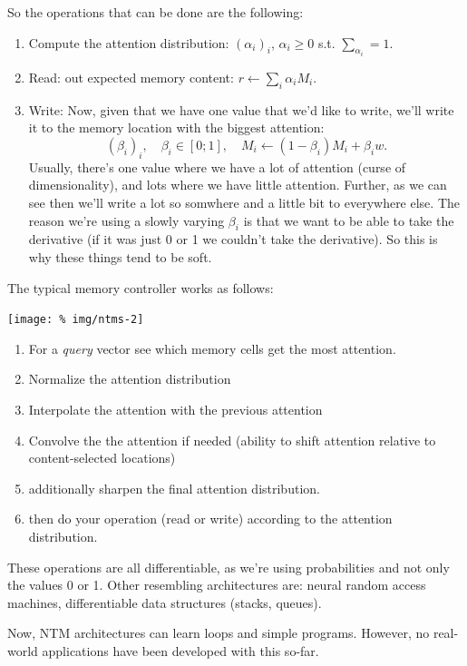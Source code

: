 \documentclass[a2paper,8pt]{extarticle}
\begin{document}
\begin{landscape}
\begin{multicols*}{7}
So the operations that can be done are the following:
\begin{enumerate}
  \item Compute the attention distribution: $(\alpha_i)_i$, $\alpha_i\geq 0$
  s.t. $\sum_{\alpha_i}=1$.
  \item Read: out expected memory content: $r\gets\sum_i \alpha_iM_i$.
  \item Write: Now, given that we have one value that we'd like to write, we'll
  write it to the memory location with the biggest attention:
  \[
  (\beta_i)_i,\quad \beta_i\in[0;1],\quad M_i\gets(1-\beta_i)M_i+\beta_iw.
  \]
  Usually, there's one value where we have a lot of attention (curse of
  dimensionality), and lots where we have little attention. Further, as we can
  see then we'll write a lot so somwhere and a little bit to everywhere else.
  The reason we're using a slowly varying $\beta_i$ is that we want to be able
  to take the derivative (if it was just 0 or 1 we couldn't take the
  derivative). So this is why these things tend to be soft.
\end{enumerate}

The typical memory controller works as follows:
\begin{center}
  \texttt{[image: \%
img/ntms-2]}
\end{center}

\begin{enumerate}
  \item For a \emph{query} vector see which memory cells get the most attention.
  \item Normalize the attention distribution
  \item Interpolate the attention with the previous attention
  \item Convolve the the attention if needed (ability to shift attention
  relative to content-selected locations)
  \item additionally sharpen the final attention distribution.
  \item then do your operation (read or write) according to the attention
  distribution.
\end{enumerate}

These operations are all differentiable, as we're using probabilities and not
only the values 0 or 1. Other resembling architectures are: neural random access
machines, differentiable data structures (stacks, queues).

Now, NTM architectures can learn loops and simple programs. However, no
real-world applications have been developed with this so-far.


\end{multicols*}
\end{landscape}
\end{document}
